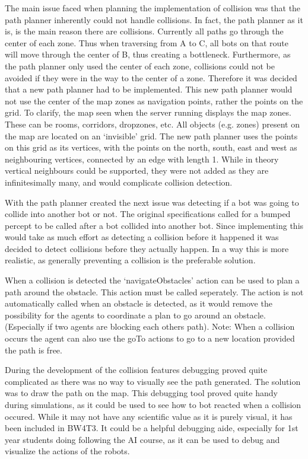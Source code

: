 \documentclass{article}
\begin{document}
The main issue faced when planning the implementation of collision was that the path planner inherently could not handle collisions. In fact, the path planner as it is, is the main reason there are collisions. Currently all paths go through the center of each zone. Thus when traversing from A to C, all bots on that route will move through the center of B, thus creating a bottleneck. Furthermore, as the path planner only used the center of each zone, collisions could not be avoided if they were in the way to the center of a zone.
Therefore it was decided that a new path planner had to be implemented. This new path planner would not use the center of the map zones as navigation points, rather the points on the grid. To clarify, the map seen when the server running displays the map zones. These can be rooms, corridors, dropzones, etc. All objects (e.g. zones) present on the map are located on an `invisible' grid. The new path planner uses the points on this grid as its vertices, with the points on the north, south, east and west as neighbouring vertices, connected by an edge with length 1. 
While in theory vertical neighbours could be supported, they were not added as they are infinitesimally many, and would complicate collision detection. 

With the path planner created the next issue was detecting if a bot was going to collide into another bot or not. The original specifications called for a bumped percept to be called after a bot collided into another bot. Since implementing this would take as much effort as detecting a collision before it happened it was decided to detect collisions before they actually happen. In a way this is more realistic, as generally preventing a collision is the preferable solution.

When a collision is detected the `navigateObstacles' action can be used to plan a path around the obstacle. This action must be called seperately. The action is not automatically called when an obstacle is detected, as it would remove the possibility for the agents to coordinate a plan to go around an obstacle. (Especially if two agents are blocking each others path). Note: When a collision occurs the agent can also use the goTo actions to go to a new location provided the path is free. 

During the development of the collision features debugging proved quite complicated as there was no way to visually see the path generated. The solution was to draw the path on the map. This debugging tool proved quite handy during simulations, as it could be used to see how to bot reacted when a collision occured. While it may not have any scientific value as it is purely visual, it has been included in BW4T3. It could be a helpful debugging aide, especially for 1st year students doing following the AI course, as it can be used to debug and visualize the actions of the robots. 
\end{document}
